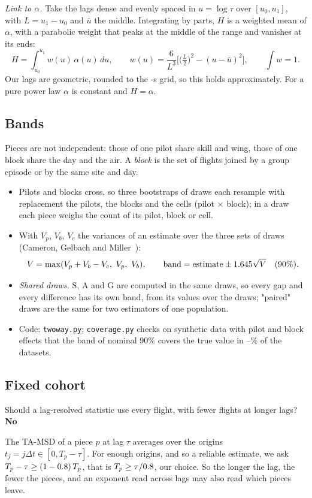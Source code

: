 \documentclass[10pt,a4paper]{article}
\newcommand{\G}{\mathrm{G}}
\newcommand{\A}{\mathrm{A}}
\newcommand{\Sl}{\mathrm{S}}
\newcommand{\Q}{\item[\textcolor{question}{\textbf{Q.}}]\color{question}}
\newcommand{\Why}{\item[\textcolor{black}{\textbf{Why.}}]\color{black}}
\newenvironment{step}{\begin{description}[leftmargin=0pt, itemsep=7pt, topsep=8pt]}{\end{description}}
\begin{document}
\begin{description}[leftmargin=0pt, itemsep=7pt]
  \emph{Link to $\alpha$.} Take the lags dense and evenly spaced in $u=\log\tau$ over $[u_0,u_1]$, with
  $L=u_1-u_0$ and $\bar u$ the middle. Integrating by parts, $H$ is a weighted mean of $\alpha$, with a
  parabolic weight that peaks at the middle of the range and vanishes at its ends:
  \[ H = \int_{u_0}^{u_1} w(u)\,\alpha(u)\,du, \qquad w(u) = \frac{6}{L^3}\Big[\big(\tfrac{L}{2}\big)^2-(u-\bar u)^2\Big],
  \qquad \int w = 1. \]
  Our lags are geometric, rounded to the \GridS-s grid, so this holds approximately. For a pure power law
  $\alpha$ is constant and $H=\alpha$.
\end{description}

\subsection{Bands}\label{bands}

Pieces are not independent: those of one pilot share skill and wing, those of one block share the day and
the air. A \emph{block} is the set of flights joined by a group episode or by the same site and day.
\begin{itemize}
\item Pilots and blocks cross, so three bootstraps of \NBoot{} draws each resample with replacement the
  pilots, the blocks and the cells (pilot $\times$ block); in a draw each piece weighs the count of its
  pilot, block or cell.
\item With $V_p$, $V_b$, $V_c$ the variances of an estimate over the three sets of draws (Cameron, Gelbach
  and Miller~\cite{cameron2011}):
  \[ V = \max(V_p + V_b - V_c,\ V_p,\ V_b), \qquad \text{band} = \text{estimate} \pm 1.645\sqrt{V}\quad(90\%). \]
\item \emph{Shared draws.} $\Sl$, $\A$ and $\G$ are computed in the same draws, so every gap and every difference
  has its own band, from its values over the draws; "paired" draws are the same for two estimators of one
  population.
\item Code: \texttt{twoway.py}; \texttt{coverage.py} checks on synthetic data with pilot and block effects that the
  band of nominal 90\% covers the true value in \CovNewMin--\CovNewMax\% of the datasets.
\end{itemize}


\subsection{Fixed cohort}\label{fixed-cohort}
\begin{step}
\Q Should a lag-resolved statistic use every flight, with fewer flights at longer lags?
  \textcolor{answer}{\textbf{No}}
\Why The TA-MSD of a piece $p$ at lag $\tau$ averages over the origins $t_j=j\Delta t\in[0,T_p-\tau]$. For
  enough origins, and so a reliable estimate, we ask $T_p-\tau\ge (1-0.8)\,T_p$, that is
  $T_p\ge\tau/0.8$, our choice. So the longer
  the lag, the fewer the pieces, and an exponent read across lags may also read which pieces leave.
\end{step}
\end{document}
